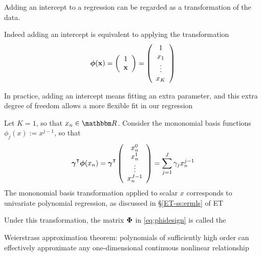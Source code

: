 \begin{frame}

    \vspace{2em}
    \Eg
    Adding an intercept to a regression can be regarded as a transformation of the
    data.  
    
    Indeed adding an intercept is equivalent to applying the transformation
    \begin{equation*}
        {\boldsymbol \phi}({\mathbf x})
        =
        \left(
        \begin{array}{c}
            1 \\ 
            {\mathbf x}
        \end{array}
        \right) 
        =
        \left(
        \begin{array}{c}
            1 \\ 
            x_1 \\
            \vdots \\
            x_K
        \end{array}
        \right) 
    \end{equation*}
    
    
    In practice, adding an intercept means fitting an extra parameter, and
    this extra degree of freedom allows a more flexible fit in our regression
    
\end{frame}

\begin{frame}

    \vspace{2em}
    \Eg
    Let $K = 1$, so that $x_n \in \RR$.  Consider the mononomial
    basis functions $\phi_j(x) := x^{j-1}$, so that
    \begin{equation}
        \label{eq:polymod}
        \boldgamma^\T \boldphi(x_n)
        = \boldgamma^\T 
        \left(
        \begin{array}{c}
            x_n^0   \\
            x_n^1   \\
            \vdots  \\
            x_n^{J-1}  
        \end{array}
        \right)
        = \sum_{j = 1}^J \gamma_j x_n^{j-1}
    \end{equation}
    The mononomial basis transformation applied to scalar $x$ corresponds to
    univariate polynomial regression, as discussed in \S\ref{ET-ss:ermls} of ET
    
    \vspace{.7em}
    Under
    this transformation, the matrix ${\boldsymbol \Phi}$ in \eqref{eq:phidesign} is
    called the 
    
    Weierstrass approximation
    theorem: polynomials of sufficiently high order can effectively
    approximate any one-dimensional continuous nonlinear relationship
    
\end{frame}

